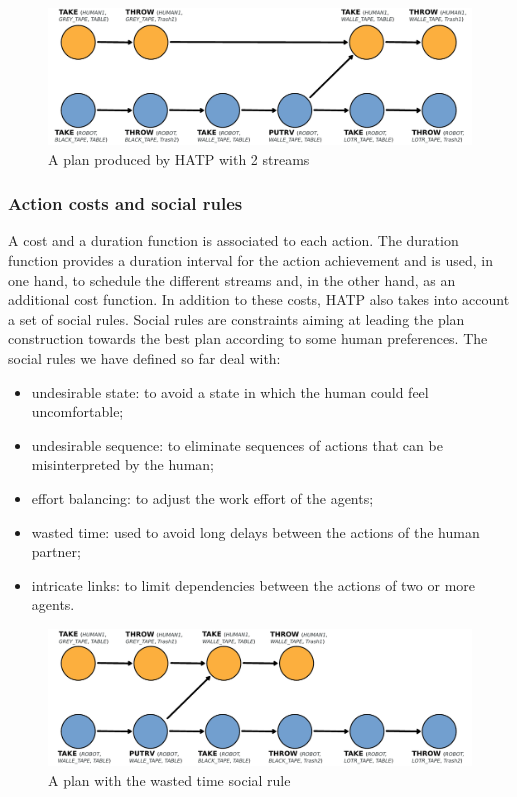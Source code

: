 \documentclass{svmult}
\begin{document}
\begin{figure}[htbp]
  \centering
  \includegraphics[width=0.95\columnwidth]{./figs/plan1.pdf}
  \caption{A plan produced by HATP with 2 streams}
  \label{plan_hatp1}
\end{figure}

\subsubsection{Action costs and social rules}

A cost and a duration function is associated to each action.  The duration
function provides a duration interval for the action achievement and is used,
in one hand, to schedule the different streams and, in the other hand, as an
additional cost function.  In addition to these costs, HATP also takes into
account a set of social rules.  Social rules are constraints aiming at leading
the plan construction towards the best plan according to some human
preferences. The social rules we have defined so far deal with:

\begin{itemize}
\item undesirable state: to avoid a state in which the human could
  feel uncomfortable;
\item undesirable sequence: to eliminate sequences of actions that can
  be misinterpreted by the human;
\item effort balancing: to adjust the work effort of the agents;
\item wasted time: used to avoid long delays between the actions of
  the human partner;
\item intricate links: to limit dependencies between the actions of
  two or more agents.
\end{itemize}

\begin{figure}[htbp]
  \centering
  \includegraphics[width=0.95\columnwidth]{./figs/plan2.pdf}
  \caption{A plan with the wasted time social rule}
  \label{plan_hatp2}
\end{figure}
\end{document}

